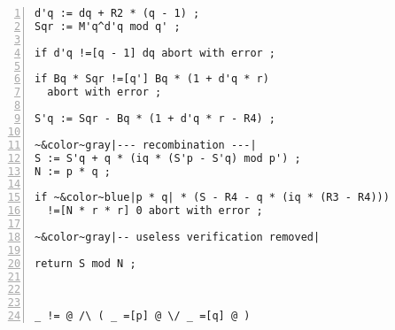 \documentclass[10pt]{article}
\theoremstyle{definition}
\theoremstyle{theorem}
\begin{document}
\begin{minipage}[c]{\textwidth}
\begin{minipage}[c]{0.42\textwidth}
\begin{minipage}[c]{\linewidth}
\begin{minipage}[c]{0.85\linewidth}
{\begin{Verbatim}[commandchars=&~|,numbers=left]
d'q := dq + R2 * (q - 1) ;
Sqr := M'q^d'q mod q' ;

if d'q !=[q - 1] dq abort with error ;

if Bq * Sqr !=[q'] Bq * (1 + d'q * r)
  abort with error ;

S'q := Sqr - Bq * (1 + d'q * r - R4) ;

~&color~gray|--- recombination ---|
S := S'q + q * (iq * (S'p - S'q) mod p') ;
N := p * q ;

if ~&color~blue|p * q| * (S - R4 - q * (iq * (R3 - R4)))
  !=[N * r * r] 0 abort with error ;

~&color~gray|-- useless verification removed|

return S mod N ;



_ != @ /\ ( _ =[p] @ \/ _ =[q] @ )
\end{Verbatim}
}
\end{minipage}
\end{minipage}

\end{minipage} \end{minipage} 
\end{document}
